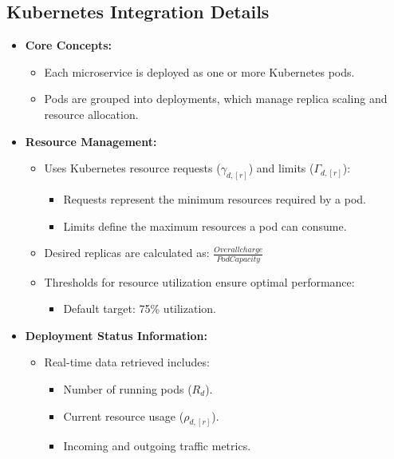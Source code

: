 \documentclass[conference]{IEEEtran}
\begin{document}
\subsection{Kubernetes Integration Details}
\begin{itemize}
    \item \textbf{Core Concepts:}
    \begin{itemize}
        \item Each microservice is deployed as one or more Kubernetes pods.
        \item Pods are grouped into deployments, which manage replica scaling and resource allocation.
        \end{itemize}
    \item \textbf{Resource Management:}
    \begin{itemize}
        \item Uses Kubernetes resource requests ($\gamma_{d,[r]}$) and limits ($\Gamma_{d,[r]}$):
        \begin{itemize}
            \item Requests represent the minimum resources required by a pod.
            \item Limits define the maximum resources a pod can consume.
        \end{itemize}
        \item Desired replicas are calculated as: $\frac{Overall charge}{Pod Capacity}$
        \item Thresholds for resource utilization ensure optimal performance:
        \begin{itemize}
            \item Default target: 75\% utilization.
        \end{itemize}
    \end{itemize}
    \item \textbf{Deployment Status Information:}
    \begin{itemize}
        \item Real-time data retrieved includes:
        \begin{itemize}
            \item Number of running pods ($R_d$).
            \item Current resource usage ($\rho_{d,[r]}$).
            \item Incoming and outgoing traffic metrics.
        \end{itemize}
    \end{itemize}
\end{itemize}
\end{document}
